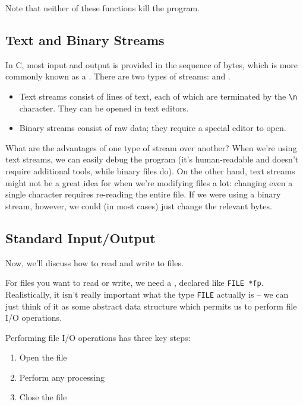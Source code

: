 Note that neither of these functions kill the program. 


\subsection{Text and Binary Streams}

In C, most input and output is provided in the sequence of bytes, which is more commonly known as a . There are two types of streams:  and . 

\begin{itemize}
    \item Text streams consist of lines of text, each of which are terminated by the \verb!\n! character. They can be opened in text editors.
    \item Binary streams consist of raw data; they require a special editor to open. 
\end{itemize}

What are the advantages of one type of stream over another? When we're using text streams, we can easily debug the program (it's human-readable and doesn't require additional tools, while binary files do). On the other hand, text streams might not be a great idea for when we're modifying files a lot: changing even a single character requires re-reading the entire file. If we were using a binary stream, however, we could (in most cases) just change the relevant bytes.

\subsection{Standard Input/Output}

Now, we'll discuss how to read and write to files.


For files you want to read or write, we need a , declared like \verb!FILE *fp!. Realistically, it isn't really important what the type \verb!FILE! actually is -- we can just think of it as some abstract data structure which permits us to perform file I/O operations. 


Performing file I/O operations has three key steps: \begin{enumerate}
    \item Open the file
    \item Perform any processing
    \item Close the file
\end{enumerate}

